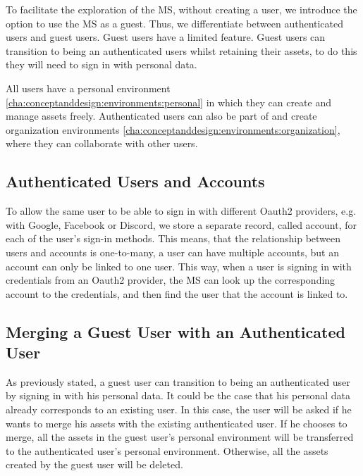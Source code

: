 To facilitate the exploration of the MS, without creating a user, we introduce the option
to use the MS as a guest.
Thus, we differentiate between authenticated users and guest users.
Guest users have a limited feature.
Guest users can transition to being an authenticated users whilst retaining their
assets, to do this they will need to sign in with personal data.

All users have a personal environment \ref{cha:conceptanddesign:environments:personal}
in which they can create and manage assets freely.
Authenticated users can also be part of and create organization environments
\ref{cha:conceptanddesign:environments:organization},
where they can collaborate with other users.

\subsection{Authenticated Users and Accounts}

To allow the same user to be able to sign in with different Oauth2 providers, e.g. with Google,
Facebook or Discord, we store a separate record, called account, for each of the user's sign-in methods.
This means, that the relationship between users and accounts is one-to-many,
a user can have multiple accounts, but an account can only be linked to one user.
This way, when a user is signing in with credentials from an Oauth2 provider,
the MS can look up the corresponding account to the credentials, and then find the user
that the account is linked to.


\subsection{Merging a Guest User with an Authenticated User}
\label{cha:conceptanddesign:users:mergeguestuser}

As previously stated, a guest user can transition to being an authenticated user by
signing in with his personal data.
It could be the case that his personal data already corresponds to an existing user.
In this case, the user will be asked if he wants to merge his assets with the existing
authenticated user.
If he chooses to merge, all the assets in the guest user's personal environment will be
transferred to the authenticated user's personal environment.
Otherwise, all the assets created by the guest user will be deleted.

